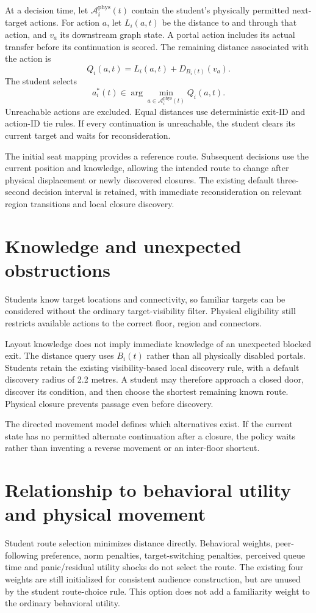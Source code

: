 \documentclass[11pt]{article}
\begin{document}
At a decision time, let $\mathcal A_i^{\mathrm{phys}}(t)$ contain the student's
physically permitted next-target actions. For action $a$, let $L_i(a,t)$ be
the distance to and through that action, and $v_a$ its downstream graph state.
A portal action includes its actual transfer before its continuation is scored.
The remaining distance associated with the action is
\[
 Q_i(a,t)=L_i(a,t)+D_{B_i(t)}(v_a).
\]
The student selects
\[
 \boxed{\displaystyle
 a_i^*(t)\in\arg\min_{a\in\mathcal A_i^{\mathrm{phys}}(t)}Q_i(a,t).}
\]
Unreachable actions are excluded. Equal distances use deterministic exit-ID
and action-ID tie rules. If every continuation is unreachable, the student
clears its current target and waits for reconsideration.

The initial seat mapping provides a reference route. Subsequent decisions
use the current position and knowledge, allowing the intended route to change
after physical displacement or newly discovered closures. The existing default
three-second decision interval is retained, with immediate reconsideration
on relevant region transitions and local closure discovery.

\section{Knowledge and unexpected obstructions}
Students know target locations and connectivity, so familiar targets can be
considered without the ordinary target-visibility filter. Physical eligibility
still restricts available actions to the correct floor, region and connectors.

Layout knowledge does not imply immediate knowledge of an unexpected blocked
exit. The distance query uses $B_i(t)$ rather than all physically disabled
portals. Students retain the existing visibility-based local discovery rule,
with a default discovery radius of 2.2 metres. A student may therefore approach
a closed door, discover its condition, and then choose the shortest remaining
known route. Physical closure prevents passage even before discovery.

The directed movement model defines which alternatives exist. If the current
state has no permitted alternate continuation after a closure, the policy waits
rather than inventing a reverse movement or an inter-floor shortcut.

\section{Relationship to behavioral utility and physical movement}
Student route selection minimizes distance directly. Behavioral weights,
peer-following preference, norm penalties, target-switching penalties,
perceived queue time and panic/residual utility shocks do not select the route.
The existing four weights are still initialized for consistent audience
construction, but are unused by the student route-choice rule. This option
does not add a familiarity weight to the ordinary behavioral utility.
\end{document}
